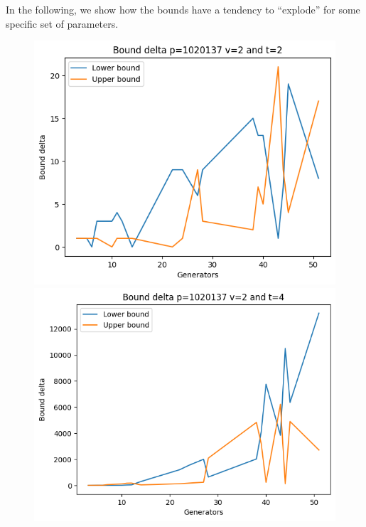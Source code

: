 \documentclass{article}
\begin{document}
In the following, we show how the bounds have a tendency to ``explode'' for some specific set of parameters.

\begin{figure}[H]\label{fig:delta_explode}
    \begin{minipage}{.49\textwidth}
            \centering
            \includegraphics[width=\textwidth]{../plots/tuples_figures/delta_1020137v2_large/Bound delta p=1020137 v=2 and t=2.png}
            \includegraphics[width=\textwidth]{../plots/tuples_figures/delta_1020137v2_large/Bound delta p=1020137 v=2 and t=4.png}

\end{minipage}
\end{figure}
\end{document}
